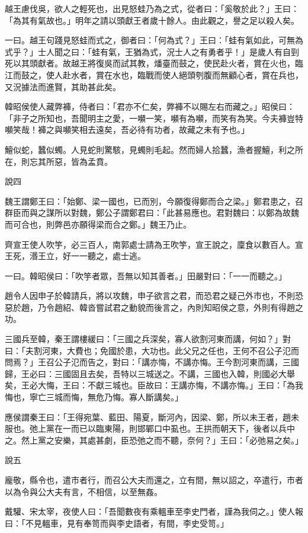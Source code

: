 \begin{pinyinscope}
越王慮伐吳，欲人之輕死也，出見怒蛙乃為之式，從者曰：「奚敬於此？」王曰：「為其有氣故也。」明年之請以頭獻王者歲十餘人。由此觀之，譽之足以殺人矣。

一曰。越王句踐見怒蛙而式之，御者曰：「何為式？」王曰：「蛙有氣如此，可無為式乎？」士人聞之曰：「蛙有氣，王猶為式，況士人之有勇者乎！」是歲人有自剄死以其頭獻者。故越王將復吳而試其教，燔臺而鼓之，使民赴火者，賞在火也，臨江而鼓之，使人赴水者，賞在水也，臨戰而使人絕頭刳腹而無顧心者，賞在兵也，又況據法而進賢，其助甚此矣。

韓昭侯使人藏弊褲，侍者曰：「君亦不仁矣，弊褲不以賜左右而藏之。」昭侯曰：「非子之所知也，吾聞明主之愛，一嚬一笑，嚬有為嚬，而笑有為笑。今夫褲豈特嚬笑哉！褲之與嚬笑相去遠矣，吾必待有功者，故藏之未有予也。」

鱣似蛇，蠶似蠋。人見蛇則驚駭，見蠋則毛起。然而婦人拾蠶，漁者握鱣，利之所在，則忘其所惡，皆為孟賁。

說四

魏王謂鄭王曰：「始鄭、梁一國也，已而別，今願復得鄭而合之梁。」鄭君患之，召群臣而與之謀所以對魏，鄭公子謂鄭君曰：「此甚易應也。君對魏曰：以鄭為故魏而可合也，則弊邑亦願得梁而合之鄭。」魏王乃止。

齊宣王使人吹竽，必三百人，南郭處士請為王吹竽，宣王說之，廩食以數百人。宣王死，湣王立，好一一聽之，處士逃。

一曰。韓昭侯曰：「吹竽者眾，吾無以知其善者。」田嚴對曰：「一一而聽之。」

趙令人因申子於韓請兵，將以攻魏，申子欲言之君，而恐君之疑己外市也，不則恐惡於趙，乃令趙紹、韓沓嘗試君之動貌而後言之，內則知昭侯之意，外則有得趙之功。

三國兵至韓，秦王謂樓緩曰：「三國之兵深矣，寡人欲割河東而講，何如？」對曰：「夫割河東，大費也；免國於患，大功也。此父兄之任也，王何不召公子氾而問焉？」王召公子氾而告之，對曰：「講亦悔，不講亦悔。王今割河東而講，三國歸，王必曰：三國固且去矣，吾特以三城送之。不講，三國也入韓，則國必大舉矣，王必大悔，王曰：不獻三城也。臣故曰：王講亦悔，不講亦悔。」王曰：「為我悔也，寧亡三城而悔，無危乃悔。寡人斷講矣。」

應侯謂秦王曰：「王得宛葉、藍田、陽夏，斷河內，因梁、鄭，所以未王者，趙未服也。弛上黨在一而已以臨東陽，則邯鄲口中虱也。王拱而朝天下，後者以兵中之。然上黨之安樂，其處甚劇，臣恐弛之而不聽，奈何？」王曰：「必弛易之矣。」

說五

龐敬，縣令也，遣市者行，而召公大夫而還之，立有間，無以詔之，卒遣行，市者以為令與公大夫有言，不相信，以至無姦。

戴驩、宋太宰，夜使人曰：「吾聞數夜有乘轀車至李史門者，謹為我伺之。」使人報曰：「不見轀車，見有奉笥而與李史語者，有間，李史受笥。」


\end{pinyinscope}

